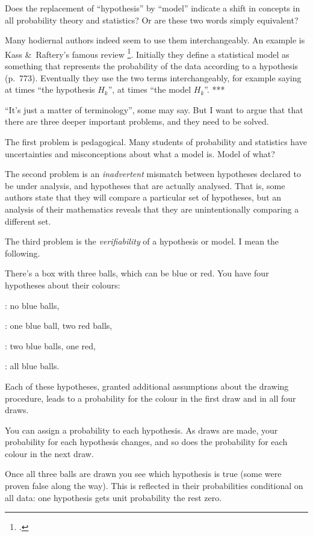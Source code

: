 \documentclass[\ifafour a4paper,12pt,\else a5paper,10pt,\fi%
onecolumn,oneside,article,%
british%
]{memoir}
\theoremstyle{remark}
\theoremstyle{innote}
\newcommand*{\citep}{\footcites}
\newcommand*{\amp}{\&}
\renewcommand*{\|}[1][]{\nonscript\,#1\vert\nonscript\;\mathopen{}}
\begin{document}
Does the replacement of \enquote{hypothesis} by \enquote{model} indicate a
shift in concepts in all probability theory and statistics? Or are these
two words simply equivalent?

Many hodiernal authors indeed seem to use them interchangeably. An example
is Kass \amp\ Raftery's famous review \citep{kassetal1995}. Initially they
define a statistical model as something that represents the probability of
the data according to a hypothesis (p.~773). Eventually they use the two
terms interchangeably, for example saying at times \enquote{the hypothesis
  $H_{k}$}, at times \enquote{the model $H_{k}$}. ***


\enquote{It's just a matter of terminology}, some may say. But I want to
argue that that there are three deeper important problems, and they need to
be solved.

The first problem is pedagogical. Many students of probability and statistics
have uncertainties and misconceptions about what a model is. Model of what?

The second problem is an \emph{inadvertent} mismatch between hypotheses
declared to be under analysis, and hypotheses that are actually analysed.
That is, some authors state that they will compare a particular set of
hypotheses, but an analysis of their mathematics reveals that they are
unintentionally comparing a different set.


The third problem is the \emph{verifiability} of a hypothesis or model. I
mean the following.


There's a box with three balls, which can be blue or red. You have four
hypotheses about their colours:
\begin{enumerate*}[label=$H_{\arabic*}$,start=0]
\item: no blue balls,
\item: one blue ball, two red balls,
\item: two blue balls, one red,
\item: all blue balls.
\end{enumerate*}
Each of these hypotheses, granted additional assumptions about the drawing
procedure, leads to a probability for the colour in the first draw and in
all four draws.

You can assign a probability to each hypothesis. As draws are made, your
probability for each hypothesis changes, and so does the probability for
each colour in the next draw.

Once all three balls are drawn you see which hypothesis is true (some were
proven false along the way). This is reflected in their probabilities
conditional on all data: one hypothesis gets unit probability the rest
zero.
\end{document}
